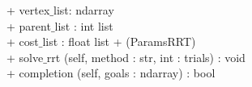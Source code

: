 {
+ vertex$\_$list: ndarray \\
+ parent$\_$list : int list \\
+ cost$\_$list : float list
}
{
+ \dunder (ParamsRRT) \\
+ solve$\_$rrt (self, method : str, int : trials) : void \\
+ completion (self, goals : ndarray) : bool
}